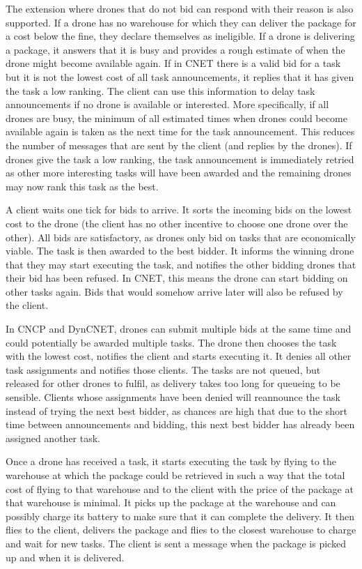 \documentclass[10pt,a4paper]{article}
\begin{document}
The extension where drones that do not bid can respond with their reason is also supported. If a drone has no warehouse for which they can deliver the package for a cost below the fine, they declare themselves as ineligible. If a drone is delivering a package, it answers that it is busy and provides a rough estimate of when the drone might become available again. If in CNET there is a valid bid for a task but it is not the lowest cost of all task announcements, it replies that it has given the task a low ranking. The client can use this information to delay task announcements if no drone is available or interested. More specifically, if all drones are busy, the minimum of all estimated times when drones could become available again is taken as the next time for the task announcement. This reduces the number of messages that are sent by the client (and replies by the drones). If drones give the task a low ranking, the task announcement is immediately retried as other more interesting tasks will have been awarded and the remaining drones may now rank this task as the best.

A client waits one tick for bids to arrive. It sorts the incoming bids on the lowest cost to the drone (the client has no other incentive to choose one drone over the other). All bids are satisfactory, as drones only bid on tasks that are economically viable. The task is then awarded to the best bidder. It informs the winning drone that they may start executing the task, and notifies the other bidding drones that their bid has been refused. In CNET, this means the drone can start bidding on other tasks again. Bids that would somehow arrive later will also be refused by the client.

In CNCP and DynCNET, drones can submit multiple bids at the same time and could potentially be awarded multiple tasks. The drone then chooses the task with the lowest cost, notifies the client and starts executing it. It denies all other task assignments and notifies those clients. The tasks are not queued, but released for other drones to fulfil, as delivery takes too long for queueing to be sensible. Clients whose assignments have been denied will reannounce the task instead of trying the next best bidder, as chances are high that due to the short time between announcements and bidding, this next best bidder has already been assigned another task.

Once a drone has received a task, it starts executing the task by flying to the warehouse at which the package could be retrieved in such a way that the total cost of flying to that warehouse and to the client with the price of the package at that warehouse is minimal. It picks up the package at the warehouse and can possibly charge its battery to make sure that it can complete the delivery. It then flies to the client, delivers the package and flies to the closest warehouse to charge and wait for new tasks. The client is sent a message when the package is picked up and when it is delivered.
\end{document}
